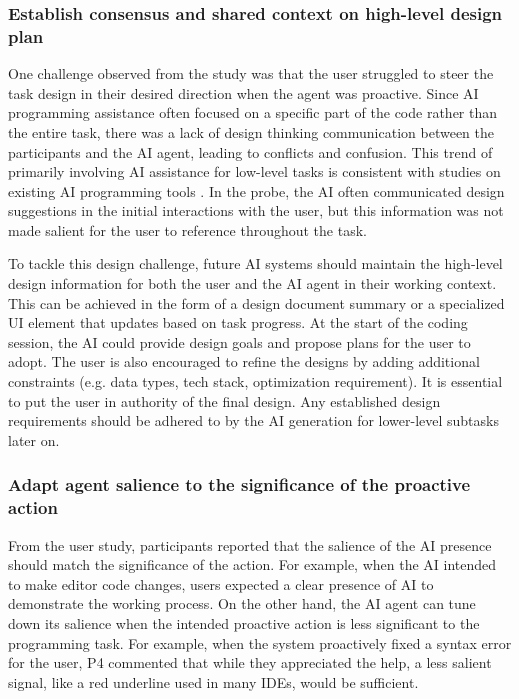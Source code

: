 \subsubsection{\textbf{Establish consensus and shared context on high-level design plan}} 
One challenge observed from the study was that the user struggled to steer the task design in their desired direction when the agent was proactive. 
Since AI programming assistance often focused on a specific part of the code rather than the entire task, there was a lack of design thinking communication between the participants and the AI agent, leading to conflicts and confusion.
This trend of primarily involving AI assistance for low-level tasks is consistent with studies on existing AI programming tools \cite{vaithilingam2022expectation, Mozannar2022ReadingBT}.
In the \sys{} probe, the AI often communicated design suggestions in the initial interactions with the user, but this information was not made salient for the user to reference throughout the task.

To tackle this design challenge, future AI systems should maintain the high-level design information for both the user and the AI agent in their working context.
This can be achieved in the form of a design document summary or a specialized UI element that updates based on task progress.
At the start of the coding session, the AI could provide design goals and propose plans for the user to adopt.
The user is also encouraged to refine the designs by adding additional constraints (e.g. data types, tech stack, optimization requirement).
It is essential to put the user in authority of the final design. Any established design requirements should be adhered to by the AI generation for lower-level subtasks later on.


\subsubsection{\textbf{Adapt agent salience to the significance of the proactive action}}
From the user study, participants reported that the salience of the AI presence should match the significance of the action.
For example, when the AI intended to make editor code changes, users expected a clear presence of AI to demonstrate the working process.
On the other hand, the AI agent can tune down its salience when the intended proactive action is less significant to the programming task.
For example, when the system proactively fixed a syntax error for the user, P4 commented that while they appreciated the help, a less salient signal, like a red underline used in many IDEs, would be sufficient.

